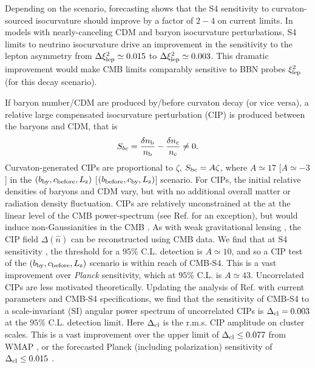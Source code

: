Depending on the scenario, forecasting shows that the S4 sensitivity to curvaton-sourced isocurvature should improve by a factor of $2-4$ on current limits. In models with nearly-canceling CDM and baryon isocurvature perturbations, S4 limits to neutrino isocurvature drive an improvement in the sensitivity to the lepton asymmetry from $\Delta \xi_{\rm lep}^{2}\simeq 0.015$ to $\Delta \xi_{\rm lep}^{2}\simeq 0.003$. This dramatic improvement would make CMB limits comparably sensitive to BBN probes $\xi_{\rm lep}^{2}$ (for this decay scenario).

If baryon number/CDM are produced by/before curvaton decay (or vice versa), a relative large compensated isocurvature perturbation (CIP) is produced between the baryons and CDM, that is
\begin{equation}
S_{bc}=\frac{\delta n_{\rm b}}{n_{\rm b}}-\frac{\delta n_{\rm c}}{n_{\rm c}}\neq 0.
\end{equation} Curvaton-generated CIPs are proportional to $\zeta$, $S_{\rm bc}=A\zeta$, where $A\simeq 17$ [$A\simeq -3$] in the $(b_{\rm by}, c_{\rm before}, L_{\rm z})$ [$(b_{\rm before}, c_{\rm by}, L_{\rm z})$] scenario. For CIPs, the initial relative densities of baryons and CDM vary, but with no additional overall matter or radiation density fluctuation.
CIPs are relatively unconstrained at the at the linear level of the CMB power-spectrum (see Ref. \cite{Munoz:2015fdv} for an exception), but would induce non-Gaussianities in the CMB \cite{Grin:2011nk,Grin:2011tf,Grin:2013uya,He:2015msa}. As with weak gravitational lensing \cite{Hu:2001kj}, the CIP field $\Delta(\hat{n})$ can be reconstructed using CMB data. We find that at S4 sensitivity \cite{He:2015msa}, the threshold for a $95\%$ C.L. detection is $A\simeq 10$, and so a CIP test of the $(b_{\rm by}, c_{\rm before}, L_{\rm z})$ scenario is within reach of CMB-S4. This is a vast improvement over \emph{Planck} sensitivity, which at $95\%$ C.L. is $A\simeq 43$. Uncorrelated CIPs are less  motivated theoretically. Updating the analysis of Ref. \cite{He:2015msa} with current parameters \cite{Ade:2015lrj} and CMB-S4 specifications, we find that the sensitivity of CMB-S4 to a scale-invariant (SI) angular power spectrum of uncorrelated CIPs is $\Delta_{\rm cl}=0.003$ at the $95\%$ C.L. detection limit. Here $\Delta_{\rm cl}$ is the r.m.s. CIP amplitude on cluster scales. This is a vast improvement over the upper limit of $\Delta_{\rm cl}\leq 0.077$ from WMAP \cite{Grin:2013uya}, or the forecasted Planck \cite{Ade:2015lrj} (including polarization) sensitivity of $\Delta_{\rm cl}\leq 0.015$ \cite{He:2015msa}. 

